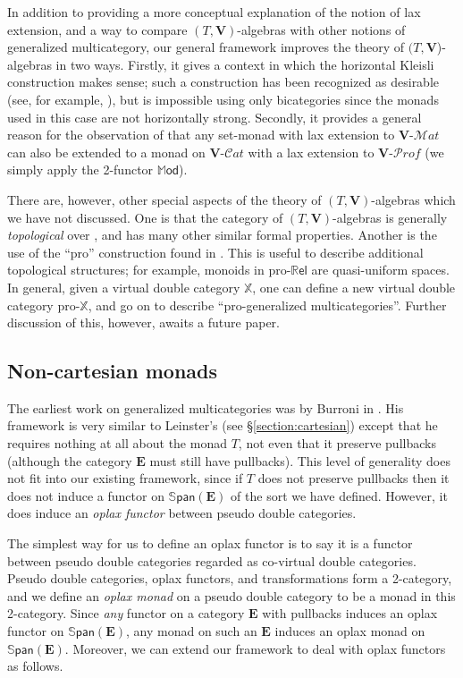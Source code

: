 \documentclass{tac}
\makeatletter
\newcommand{\mb}[1]{{\mathbf{#1}}}
\newcommand{\mat}[1]{\mathbf{#1}\mbox{-}\mathcal{M}\mathit{at}}
\newcommand{\prof}[1]{\mathbf{#1}\mbox{-}\mathcal{P}\mathit{rof}}
\newcommand{\cat}[1]{\mathbf{#1}\mbox{-}\mathcal{C}\mathit{at}}
\newcommand{\SPAN}[1]{\mathbb{S}\mathsf{pan}\!\left(\mb{#1}\right)}
\newcommand{\MOD}{\mathbb{M}\mathsf{od}}
\newcommand{\pro}{\mbox{pro-}}
\newcommand{\Rel}{\mathbb{R}\mathsf{el}}
\numberwithin{equation}{section}
\def\currthmtype{}
\let\old@label\label
\def\label#1{%
    {\let\your@currentlabel\@currentlabel%
      \edef\@currentlabel{\currthmtype}%
      \old@label{label@name@#1}}%
    \old@label{#1}}
\makeatother
\begin{document}
In addition to providing a more conceptual explanation of the notion of
lax extension, and a way to compare $(T,\mb V)$-algebras with other
notions of generalized multicategory, our general framework improves the
theory of $(T, \mb{V}$)-algebras in two ways.  Firstly, it gives a
context in which the horizontal Kleisli construction makes sense; such a
construction has been recognized as desirable (see, for example,
\cite[p.~7]{tholen:coursenotes}), but is impossible using only
bicategories since the monads used in this case are not horizontally
strong.  Secondly, it provides a general reason for the observation of
\cite[p.~15]{tholen:coursenotes} that any set-monad with lax extension
to $\mat{V}$ can also be extended to a monad on $\cat{V}$ with a lax
extension to $\prof{V}$ (we simply apply the 2-functor $\MOD$).
 
There are, however, other special aspects of the theory of
$(T,\mb{V})$-algebras which we have not discussed.  One is that the
category of $(T,\mb{V})$-algebras is generally \emph{topological} over
\Set, and has many other similar formal properties.  Another is the use
of the ``pro'' construction found in \cite{OneSetting}.  This is useful
to describe additional topological structures; for example, monoids in
$\pro\Rel$ are quasi-uniform spaces.  In general, given a virtual double
category $\mathbb{X}$, one can define a new virtual double category
$\pro\mathbb{X}$, and go on to describe ``pro-generalized
multicategories''.  Further discussion of this, however, awaits a future
paper.




\subsection{Non-cartesian monads}
\label{sec:non-cartesian-monads}

The earliest work on generalized multicategories was by Burroni in
\cite{burroni:t-cats}.  His framework is very similar to Leinster's (see
\S\ref{section:cartesian})
except that he requires nothing at all about the monad $T$, not even
that it preserve pullbacks (although the category $\mb{E}$ must still
have pullbacks).  This level of generality does not fit into our
existing framework, since if $T$ does not preserve pullbacks then it
does not induce a functor on $\SPAN{E}$ of the sort we have defined.
However, it does induce an \emph{oplax functor} between pseudo double
categories.

The simplest way for us to define an oplax functor is to say it is a
functor between pseudo double categories regarded as co-virtual double
categories.  Pseudo double categories, oplax functors, and
transformations form a 2-category, and we define an \emph{oplax monad}
on a pseudo double category to be a monad in this 2-category.  Since
\emph{any} functor on a category $\mb{E}$ with pullbacks induces an
oplax functor on $\SPAN{E}$, any monad on such an $\mb{E}$ induces an
oplax monad on $\SPAN{E}$.  Moreover, we can extend our framework to
deal with oplax functors as follows.
\end{document}
